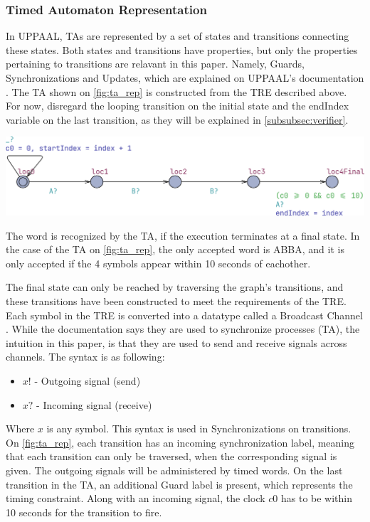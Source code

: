 \subsubsection{Timed Automaton Representation}\label{subsubsec:ta_rep}
In UPPAAL, TAs are represented by a set of states and transitions connecting these states.
Both states and transitions have properties, but only the properties pertaining to transitions are relavant in this paper. Namely, Guards, Synchronizations and Updates, which are explained on UPPAAL's documentation \cite{UPPAAL}.
The TA shown on \cref{fig:ta_rep} is constructed from the TRE described above. For now, disregard the looping transition on the initial state and the endIndex variable on the last transition, as they will be explained in \cref{subsubsec:verifier}.
\begin{center}
    \includegraphics[width=\columnwidth]{Documents/Diagrams/CheckingFigures/checking_tarep.png}
    \label{fig:ta_rep}
\end{center}
The word is recognized by the TA, if the execution terminates at a final state.
In the case of the TA on \cref{fig:ta_rep}, the only accepted word is ABBA, and it is only accepted if the 4 symbols appear within 10 seconds of eachother.

The final state can only be reached by traversing the graph's transitions, and these transitions have been constructed to meet the requirements of the TRE. Each symbol in the TRE is converted into a datatype called a Broadcast Channel \cite{UPPAAL}. While the documentation says they are used to synchronize processes (TA), the intuition in this paper, is that they are used to send and receive signals across channels. The syntax is as following:
\begin{itemize}
    \setlength\itemsep{-0.5em}
    \item $x!$ - Outgoing signal (send)
    \item $x?$ - Incoming signal (receive)
\end{itemize}
Where $x$ is any symbol. This syntax is used in Synchronizations on transitions. On \cref{fig:ta_rep}, each transition has an incoming synchronization label, meaning that each transition can only be traversed, when the corresponding signal is given. The outgoing signals will be administered by timed words. On the last transition in the TA, an additional Guard label is present, which represents the timing constraint. Along with an incoming signal, the clock $c0$ has to be within 10 seconds for the transition to fire.


